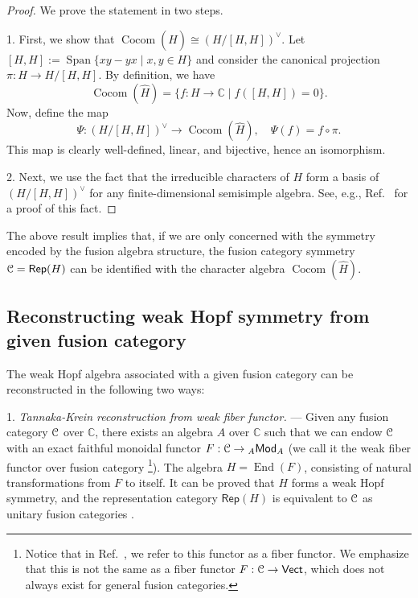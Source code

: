 \documentclass[a4paper,11pt]{article}
\theoremstyle{theorem}
\theoremstyle{remark}
\newcommand\eC           {\EuScript{C}}
\newcommand{\Cbb}{\mathbb{C}}
\newcommand{\Rep}{\mathsf{Rep}}
\newcommand{\Mod}{\mathsf{Mod}}
\newcommand{\Cocom}{\operatorname{Cocom}}
\begin{document}
\begin{proof}
We prove the statement in two steps.

1. First, we show that $\Cocom(\hat{H}) \cong (H/[H,H])^{\vee}$.  
Let $[H,H] := \operatorname{Span}\{ xy - yx \mid x,y \in H\}$ and consider the canonical projection $\pi: H \to H/[H,H]$.  
By definition, we have
\[
\Cocom(\hat{H}) = \{ f: H \to \Cbb \mid f([H,H]) = 0 \}.
\]  
Now, define the map
\[
\Psi: (H/[H,H])^{\vee} \to \Cocom(\hat{H}), \quad \Psi(f) = f \circ \pi.
\]  
This map is clearly well-defined, linear, and bijective, hence an isomorphism.

2. Next, we use the fact that the irreducible characters of $H$ form a basis of $(H/[H,H])^{\vee}$ for any finite-dimensional semisimple algebra.  
See, e.g., Ref.~\cite[Theorem 3.6.2]{etingof2011introduction} for a proof of this fact.
\end{proof}

The above result implies that, if we are only concerned with the symmetry encoded by the fusion algebra structure, the fusion category symmetry $\eC = \Rep(H)$ can be identified with the character algebra $\Cocom(\hat{H})$.



\subsection{Reconstructing weak Hopf symmetry from given fusion category}
\label{sec:reconstrucWHA}

The weak Hopf algebra associated with a given fusion category can be reconstructed in the following two ways:

1. \emph{Tannaka-Krein reconstruction from weak fiber functor.} --- Given any fusion category $\eC$ over $\Cbb$, there exists an algebra $A$ over $\mathbb{C}$ such that we can endow $\eC$ with an exact faithful monoidal functor $F: \eC \to {_A}\Mod_A$ (we call it the  weak fiber functor over fusion category \footnote{Notice that in Ref.~\cite{jia2024weakTube}, we refer to this functor as a fiber functor. We emphasize that this is not the same as a fiber functor $F: \eC \to \mathsf{Vect}$, which does not always exist for general fusion categories.}). The algebra $H = \operatorname{End}(F)$, consisting of natural transformations from $F$ to itself. It can be proved that $H$ forms a weak Hopf symmetry, and the representation category $\Rep(H)$ is equivalent to $\eC$ as unitary fusion categories \cite{szlachanyi2000finite,ostrik2003module}.
\end{document}
